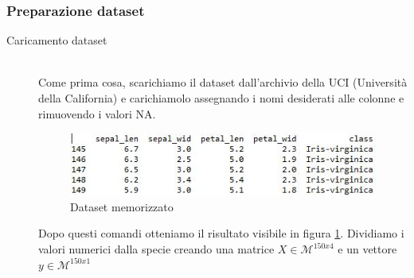 \documentclass[12pt]{article}
\newcommand{\codice}[2]{}
\begin{document}
		\subsubsection{Preparazione dataset}

			\begin{description}

				\item[Caricamento dataset] \hfill \\
				Come prima cosa, scarichiamo il dataset dall'archivio della UCI (Università della California) e carichiamolo assegnando i nomi desiderati alle colonne e rimuovendo i valori NA.
				
				
				
				\begin{figure}[H]
					\begin{center}
						\includegraphics[scale=.7]{tab}
						\caption{Dataset memorizzato}
						\label{fig:dataset}
					\end{center}
				\end{figure}
				
				Dopo questi comandi otteniamo il risultato visibile in figura \ref{fig:dataset}. Dividiamo i valori numerici dalla specie creando una matrice $X \in \mathcal{M}^{150x4}$ e un vettore $y \in \mathcal{M}^{150x1}$
				
				\codice{30}{32}
				

\end{description}
\end{document}
